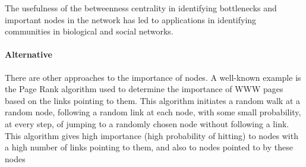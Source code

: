\nd The usefulness of the betweenness centrality in identifying bottlenecks and important nodes in the network has led to applications in identifying communities in biological and social networks. \s

\paragraph{Alternative} There are other approaches to the importance of nodes. A well-known example is the Page Rank algorithm used to determine the importance of WWW pages based on the links pointing to them. This algorithm initiates a random walk at a random node, following a random link at each node, with some small probability, at every step, of jumping to a randomly chosen node without following a link. This algorithm gives high importance (high probability of hitting) to nodes with a high number of links pointing to them, and also to nodes pointed to by these nodes
